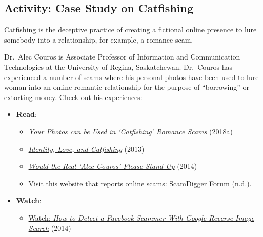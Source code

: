 \documentclass[
  letterpaper,
  DIV=11,
  numbers=noendperiod]{scrreprt}
\providecommand{\tightlist}{%
  \setlength{\itemsep}{0pt}\setlength{\parskip}{0pt}}\usepackage{longtable,booktabs,array}
\begin{document}
\subsection{Activity: Case Study on
Catfishing}\label{activity-case-study-on-catfishing}

\begin{tcolorbox}[enhanced jigsaw, toprule=.15mm, colback=white, colframe=quarto-callout-note-color-frame, bottomtitle=1mm, leftrule=.75mm, coltitle=black, titlerule=0mm, rightrule=.15mm, colbacktitle=quarto-callout-note-color!10!white, left=2mm, title={Learning Activity}, opacitybacktitle=0.6, opacityback=0, breakable, toptitle=1mm, arc=.35mm, bottomrule=.15mm]

Catfishing is the deceptive practice of creating a fictional online
presence to lure somebody into a relationship, for example, a romance
scam.

Dr.~Alec Couros is Associate Professor of Information and Communication
Technologies at the University of Regina, Saskatchewan. Dr.~Couros has
experienced a number of scams where his personal photos have been used
to lure woman into an online romantic relationship for the purpose of
``borrowing'' or extorting money. Check out his experiences:

\begin{itemize}
\tightlist
\item
  \textbf{Read}:

  \begin{itemize}
  \tightlist
  \item
    \href{https://www.cbc.ca/radio/spark/380-phantom-traffic-jams-catfishing-scams-and-smart-speakers-1.4482967/your-photos-can-be-used-in-catfishing-romance-scams-1.4482985}{\emph{Your
    Photos can be Used in `Catfishing' Romance Scams}} (2018a)
  \item
    \href{http://educationaltechnology.ca/2393/}{\emph{Identity, Love,
    and Catfishing}} (2013)
  \item
    \href{http://educationaltechnology.ca/2466/}{\emph{Would the Real
    `Alec Couros' Please Stand Up}} (2014)
  \item
    Visit this website that reports online scams:
    \href{https://romancescam.com/}{ScamDigger Forum} (n.d.).
  \end{itemize}
\item
  \textbf{Watch}:

  \begin{itemize}
  \tightlist
  \item
    \href{https://www.youtube.com/watch?v=s6Q4U8DvJH8}{Watch: \emph{How
    to Detect a Facebook Scammer With Google Reverse Image Search}}
    (2014)
  \end{itemize}
\end{itemize}


\end{tcolorbox}
\end{document}
